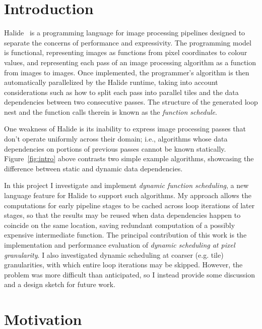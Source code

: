 \documentclass{article}
\begin{document}
\section{Introduction}

Halide~\cite{halide} is a programming language for image processing pipelines designed to separate the concerns of performance and expressivity. The programming model is functional, representing images as functions from pixel coordinates to colour values, and representing each pass of an image processing algorithm as a function from images to images. Once implemented, the programmer's algorithm is then automatically parallelized by the Halide runtime, taking into account considerations such as how to split each pass into parallel tiles and the data dependencies between two consecutive passes.
The structure of the generated loop nest and the function calls therein is known as the {\em function schedule}.

One weakness of Halide is its inability to express image processing passes that don't operate uniformly across their domain; i.e., algorithms whose data dependencies on portions of previous passes cannot be known statically.
Figure~\ref{fig:intro} above contrasts two simple example algorithms, showcasing the difference between static and dynamic data dependencies.

In this project I investigate and implement {\em dynamic function scheduling}, a new language feature for Halide to support such algorithms.
My approach allows the computations for early pipeline stages to be cached across loop iterations of later stages, so that the results may be reused when data dependencies happen to coincide on the same location, saving redundant computation of a possibly expensive intermediate function.
The principal contribution of this work is the implementation and performance evaluation of {\em dynamic scheduling at pixel granularity}. I also investigated dynamic scheduling at coarser (e.g. tile) granularities, with which entire loop iterations may be skipped. However, the problem was more difficult than anticipated, so I instead provide some discussion and a design sketch for future work.

\section{Motivation}
\end{document}
